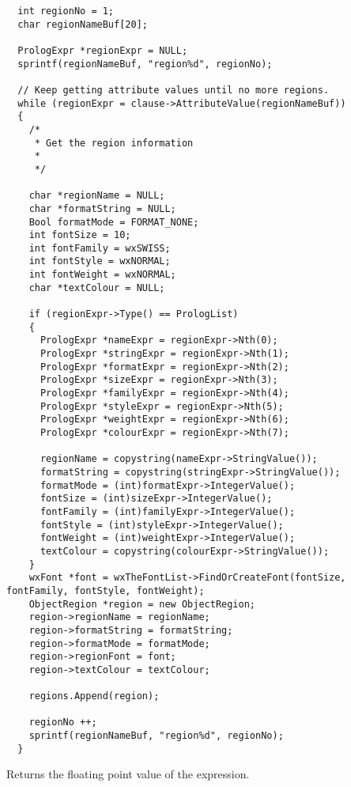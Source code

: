 \begin{verbatim}
  int regionNo = 1;
  char regionNameBuf[20];

  PrologExpr *regionExpr = NULL;
  sprintf(regionNameBuf, "region%d", regionNo);

  // Keep getting attribute values until no more regions.
  while (regionExpr = clause->AttributeValue(regionNameBuf))
  {
    /*
     * Get the region information
     *
     */

    char *regionName = NULL;
    char *formatString = NULL;
    Bool formatMode = FORMAT_NONE;
    int fontSize = 10;
    int fontFamily = wxSWISS;
    int fontStyle = wxNORMAL;
    int fontWeight = wxNORMAL;
    char *textColour = NULL;

    if (regionExpr->Type() == PrologList)
    {
      PrologExpr *nameExpr = regionExpr->Nth(0);
      PrologExpr *stringExpr = regionExpr->Nth(1);
      PrologExpr *formatExpr = regionExpr->Nth(2);
      PrologExpr *sizeExpr = regionExpr->Nth(3);
      PrologExpr *familyExpr = regionExpr->Nth(4);
      PrologExpr *styleExpr = regionExpr->Nth(5);
      PrologExpr *weightExpr = regionExpr->Nth(6);
      PrologExpr *colourExpr = regionExpr->Nth(7);

      regionName = copystring(nameExpr->StringValue());
      formatString = copystring(stringExpr->StringValue());
      formatMode = (int)formatExpr->IntegerValue();
      fontSize = (int)sizeExpr->IntegerValue();
      fontFamily = (int)familyExpr->IntegerValue();
      fontStyle = (int)styleExpr->IntegerValue();
      fontWeight = (int)weightExpr->IntegerValue();
      textColour = copystring(colourExpr->StringValue());
    }
    wxFont *font = wxTheFontList->FindOrCreateFont(fontSize, fontFamily, fontStyle, fontWeight);
    ObjectRegion *region = new ObjectRegion;
    region->regionName = regionName;
    region->formatString = formatString;
    region->formatMode = formatMode;
    region->regionFont = font;
    region->textColour = textColour;

    regions.Append(region);

    regionNo ++;
    sprintf(regionNameBuf, "region%d", regionNo);
  }
\end{verbatim}



Returns the floating point value of the expression.


